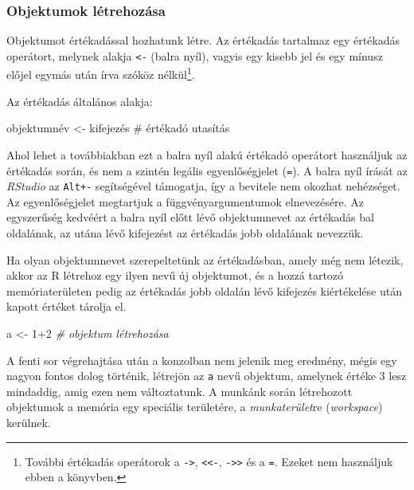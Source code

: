 \documentclass[
]{book}
\newenvironment{Shaded}{\begin{snugshade}}{\end{snugshade}}
\newcommand{\CommentTok}[1]{\textcolor[rgb]{0.56,0.35,0.01}{\textit{#1}}}
\newcommand{\DecValTok}[1]{\textcolor[rgb]{0.00,0.00,0.81}{#1}}
\newcommand{\NormalTok}[1]{#1}
\newcommand{\OtherTok}[1]{\textcolor[rgb]{0.56,0.35,0.01}{#1}}
\newcommand{\SpecialCharTok}[1]{\textcolor[rgb]{0.00,0.00,0.00}{#1}}
\begin{document}
\hypertarget{objektumok-luxe9trehozuxe1sa}{%
\subsubsection{Objektumok létrehozása}\label{objektumok-luxe9trehozuxe1sa}}

Objektumot értékadással hozhatunk létre. Az értékadás tartalmaz egy értékadás operátort, melynek alakja \texttt{\textless{}-} (balra nyíl), vagyis egy kisebb jel és egy mínusz előjel egymás után írva szóköz nélkül\footnote{További értékadás operátorok a \texttt{-\textgreater{}}, \texttt{\textless{}\textless{}-}, \texttt{-\textgreater{}\textgreater{}} és a \texttt{=}. Ezeket nem használjuk ebben a könyvben.}.

Az értékadás általános alakja:

\begin{Shaded}
\begin{Highlighting}[]
\NormalTok{objektumnév \textless{}{-} kifejezés    \# értékadó utasítás}
\end{Highlighting}
\end{Shaded}

Ahol lehet a továbbiakban ezt a balra nyíl alakú értékadó operátort használjuk az értékadás során, és nem a szintén legális egyenlőségjelet (\texttt{=}). A balra nyíl írását az \emph{RStudio} az \texttt{Alt+-} segítségével támogatja, így a bevitele nem okozhat nehézséget. Az egyenlőségjelet megtartjuk a függvényargumentumok elnevezésére. Az egyszerűség kedvéért a balra nyíl előtt lévő objektumnevet az értékadás bal oldalának, az utána lévő kifejezést az értékadás jobb oldalának nevezzük.

Ha olyan objektumnevet szerepeltetünk az értékadásban, amely még nem létezik, akkor az R létrehoz egy ilyen nevű új objektumot, és a hozzá tartozó memóriaterületen pedig az értékadás jobb oldalán lévő kifejezés kiértékelése után kapott értéket tárolja el.

\begin{Shaded}
\begin{Highlighting}[]
\NormalTok{a }\OtherTok{\textless{}{-}} \DecValTok{1}\SpecialCharTok{+}\DecValTok{2}    \CommentTok{\# objektum létrehozása}
\end{Highlighting}
\end{Shaded}

A fenti sor végrehajtása után a konzolban nem jelenik meg eredmény, mégis egy nagyon fontos dolog történik, létrejön az \texttt{a} nevű objektum, amelynek értéke 3 lesz mindaddig, amig ezen nem változtatunk. A munkánk során létrehozott objektumok a memória egy speciális területére, a \emph{munkaterület}re (\emph{workspace}) kerülnek.
\end{document}

